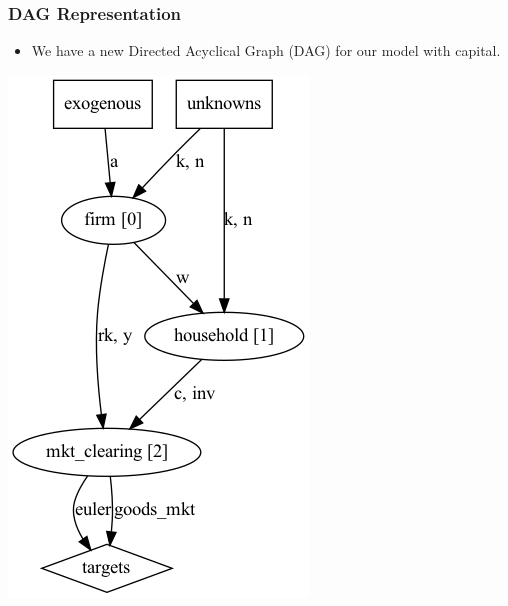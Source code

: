 \documentclass[english,xcolor=svgnames]{beamer}
\begin{document}
\begin{frame}
    \frametitle{DAG Representation}
		\begin{itemize}
			\item We have a new Directed Acyclical Graph (DAG) for our model with capital.
		\end{itemize}
		\centering
		\includegraphics[scale=0.4]{dag/RBC.png}
\end{frame}
\end{document}
